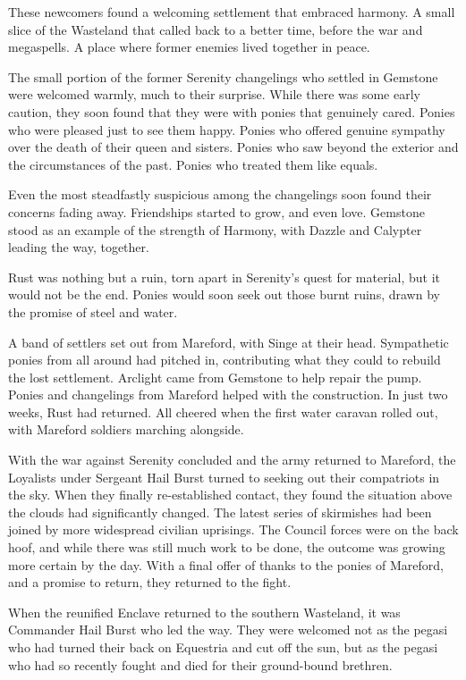 These newcomers found a welcoming settlement that embraced harmony. A small slice of the Wasteland that called back to a better time, before the war and megaspells. A place where former enemies lived together in peace.

The small portion of the former Serenity changelings who settled in Gemstone were welcomed warmly, much to their surprise. While there was some early caution, they soon found that they were with ponies that genuinely cared. Ponies who were pleased just to see them happy. Ponies who offered genuine sympathy over the death of their queen and sisters. Ponies who saw beyond the exterior and the circumstances of the past. Ponies who treated them like equals.

Even the most steadfastly suspicious among the changelings soon found their concerns fading away. Friendships started to grow, and even love. Gemstone stood as an example of the strength of Harmony, with Dazzle and Calypter leading the way, together.

{\br}%
Rust was nothing but a ruin, torn apart in Serenity’s quest for material, but it would not be the end. Ponies would soon seek out those burnt ruins, drawn by the promise of steel and water.

A band of settlers set out from Mareford, with Singe at their head. Sympathetic ponies from all around had pitched in, contributing what they could to rebuild the lost settlement. Arclight came from Gemstone to help repair the pump. Ponies and changelings from Mareford helped with the construction. In just two weeks, Rust had returned. All cheered when the first water caravan rolled out, with Mareford soldiers marching alongside.

{\br}%
With the war against Serenity concluded and the army returned to Mareford, the Loyalists under Sergeant Hail Burst turned to seeking out their compatriots in the sky. When they finally re-established contact, they found the situation above the clouds had significantly changed. The latest series of skirmishes had been joined by more widespread civilian uprisings. The Council forces were on the back hoof, and while there was still much work to be done, the outcome was growing more certain by the day. With a final offer of thanks to the ponies of Mareford, and a promise to return, they returned to the fight.

When the reunified Enclave returned to the southern Wasteland, it was Commander Hail Burst who led the way. They were welcomed not as the pegasi who had turned their back on Equestria and cut off the sun, but as the pegasi who had so recently fought and died for their ground-bound brethren.

